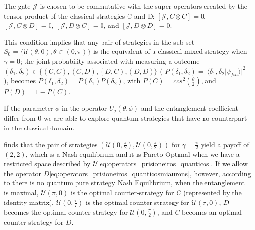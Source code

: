 The gate $\mathcal{J}$ is chosen to be commutative with the super-operators created by the tensor product of the classical strategies C and D: $ [ \mathcal{J} , C \otimes C ] = 0 $, $ [ \mathcal{J} , C \otimes D ] = 0 $, $ [ \mathcal{J} , D \otimes C ] = 0 $, and $ [ \mathcal{J} , D \otimes D ] = 0 $. 

This condition implies that any pair of strategies in the sub-set $S_{0} = \{ \mathcal{U} ( \theta , 0) , \theta \in (0, \pi) \}$ is the equivalent of a classical mixed strategy when $\gamma = 0$; the joint probability associated with measuring a outcome $(\delta_{1}, \delta_{2}) \in \{ (C, C), (C, D), (D, C), (D, D) \} $ ( $ P( \delta_{1} , \delta_{2} ) = { \vert \langle \delta_{1} , \delta_{2} \vert \psi_{fin} \rangle \vert }^{2} $ ), becomes $ P( \delta_{1} , \delta_{2} ) =P( \delta_{1} ) P( \delta_{2})$, with $P(C) = cos^{2}(\frac{ \theta }{2})$, and $P(D) = 1 - P(C)$\cite{Eisert2008}.

If the parameter $\phi$ in the operator $U_{j}(\theta ,\phi)$ and the entanglement coefficient differ from $0$ we are able to explore quantum strategies that have no counterpart in the classical domain.

\cite{Eisert2008} finds that the pair of strategies $( \mathcal{U}( 0 , \frac{\pi}{2}), \mathcal{U}( 0 , \frac{\pi}{2}))$ for $\gamma = \frac{\pi}{2}$ yield  a payoff of $(2,2)$, which is a Nash equilibrium and it is Pareto Optimal when we have a restricted space described by $\mathcal{U}$\eqref{eq:operators_prisioneiros_quanticos}. If we allow the operator $D$\eqref{eq:operators_prisioneiros_quanticosmiaurons}, however, according to \cite{Letters2002} there is no quantum pure strategy Nash Equilibrium, when the entanglement is maximal, $\mathcal{U}(\pi, 0)$ is the optimal counter-strategy for $C$ (represented by the identity matrix), $\mathcal{U}(0, \frac{\pi}{2})$ is the optimal counter strategy for $\mathcal{U}(\pi, 0)$, $D$ becomes the optimal counter-strategy for $\mathcal{U}(0, \frac{\pi}{2})$, and $C$ becomes an optimal counter strategy for $D$\cite{Du}.




